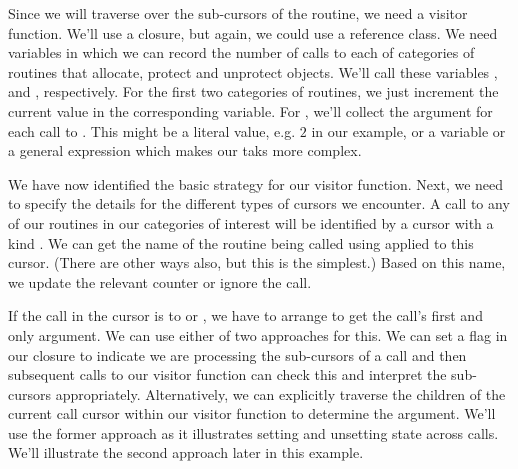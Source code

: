 Since we will traverse over the sub-cursors of the routine, we need a
visitor function. We'll use a closure, but again, we could use a
reference class.  We need variables in which we can record the number
of calls to each of categories of routines that allocate, protect and
unprotect objects.  We'll call these variables ,
 and , respectively.
For the first two categories of routines, we just increment the
current value in the corresponding \R{} variable.  For
, we'll collect the argument for each call to
. This might be a literal value, e.g. $2$ in our
example, or a variable or a general expression which makes our taks
more complex.

We have now identified the basic strategy for our visitor function.
Next, we need to specify the details for the different types of
cursors we encounter. A call to any of our routines in our categories
of interest will be identified by a cursor with a kind
.  We can get the name of the routine being
called using  applied to this cursor. (There are other
ways also, but this is the simplest.)  Based on this name, we update
the relevant counter or ignore the call. 

If the call in the cursor is to  or
, we have to arrange to get the call's first and only
argument.  We can use either of two approaches for this.  We can set a
flag in our closure to indicate we are processing the sub-cursors of a
 call and then subsequent calls to our visitor
function can check this and interpret the sub-cursors
appropriately. Alternatively, we can explicitly traverse the children
of the current call cursor within our visitor function to determine
the argument.  We'll use the former approach as it illustrates setting
and unsetting state across calls. We'll illustrate the second approach
later in this example.

